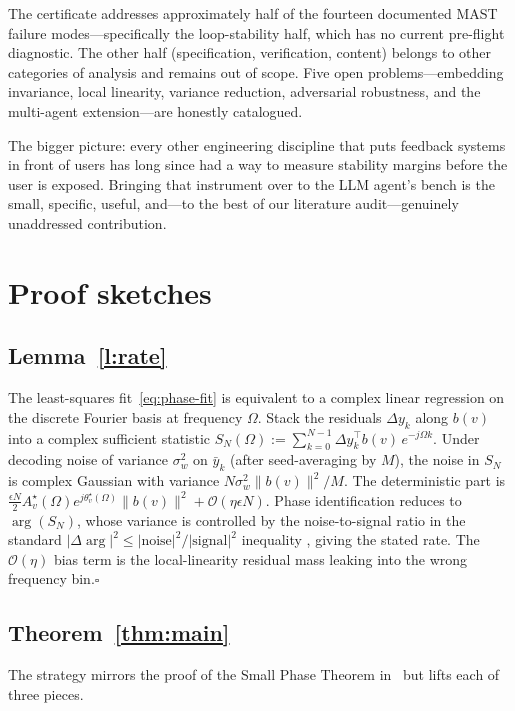 \documentclass[11pt,a4paper]{article}
\theoremstyle{definition}
\theoremstyle{remark}
\newcommand{\T}{^{\!\top}}
\begin{document}
The certificate addresses approximately half of the fourteen documented
MAST failure modes---specifically the loop-stability half, which has no
current pre-flight diagnostic.  The other half (specification,
verification, content) belongs to other categories of analysis and
remains out of scope.  Five open problems---embedding invariance, local
linearity, variance reduction, adversarial robustness, and the multi-agent
extension---are honestly catalogued.

The bigger picture: every other engineering discipline that puts feedback
systems in front of users has long since had a way to measure stability
margins before the user is exposed.  Bringing that instrument over to
the LLM agent's bench is the small, specific, useful, and---to the best
of our literature audit---genuinely unaddressed contribution.

\appendix
\section{Proof sketches}\label{app:proofs}

\subsection*{Lemma~\ref{l:rate}}
The least-squares fit~\eqref{eq:phase-fit} is equivalent to a complex
linear regression on the discrete Fourier basis at frequency $\Omega$.
Stack the residuals $\Delta y_{k}$ along $b(v)$ into a complex
sufficient statistic $S_{N}(\Omega) := \sum_{k=0}^{N-1}\Delta y_{k}\T b(v)\,
e^{-j\Omega k}$.  Under decoding noise of variance $\sigma_{w}^{2}$ on
$\bar y_{k}$ (after seed-averaging by $M$), the noise in $S_{N}$ is
complex Gaussian with variance $N\sigma_{w}^{2}\|b(v)\|^{2}/M$.  The
deterministic part is
$\frac{\epsilon N}{2}A_{v}^{\star}(\Omega)e^{j\theta_{v}^{\star}(\Omega)}\|b(v)\|^{2}+\mathcal{O}(\eta\epsilon N)$.
Phase identification reduces to $\arg(S_{N})$, whose variance is
controlled by the noise-to-signal ratio in the standard
$|\Delta\arg|^{2}\le |\text{noise}|^{2}/|\text{signal}|^{2}$ inequality
\citep{Rife1974FrequencyEstimation}, giving the stated rate. The
$\mathcal{O}(\eta)$ bias term is the local-linearity residual mass leaking
into the wrong frequency bin.\hfill$\square$

\subsection*{Theorem~\ref{thm:main}}
The strategy mirrors the proof of the Small Phase Theorem
in~\citep{Chen2023PhaseTheory} but lifts each of three pieces.
\end{document}
